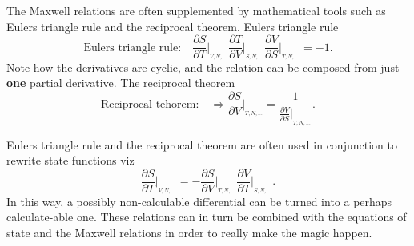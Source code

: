 The Maxwell relations are often supplemented by mathematical tools such as Eulers triangle rule and the reciprocal theorem. Eulers triangle rule
\begin{equation}
	\text{Eulers triangle rule:} \quad \frac{\partial S}{\partial T}\bigg|_{_{V,N,\dots}}\frac{\partial T}{\partial V}\bigg|_{_{S,N,\dots}}\frac{\partial V}{\partial S}\bigg|_{_{T,N,\dots}}=-1.
	\label{q9}
\end{equation} 
Note how the derivatives are cyclic, and the relation can be composed from just \textbf{one} partial derivative. The reciprocal theorem
\begin{equation}
	\text{Reciprocal tehorem:}\quad \Rightarrow \frac{\partial S}{\partial V}\bigg|_{_{T,N,\dots}}=\frac{1}{\frac{\partial V}{\partial S}\big|_{_{T,N,\dots}}}.
	\label{q10}    
\end{equation} 

\begin{example}
	Eulers triangle rule and the reciprocal theorem are often used in conjunction to rewrite state functions viz
	\begin{equation}
		\frac{\partial S}{\partial T}\bigg|_{_{V,N,\dots}}=-\frac{\partial S}{\partial V}\bigg|_{_{T,N,\dots}}\frac{\partial V}{\partial T}\bigg|_{_{S,N,\dots}}  .
	\end{equation}  
	In this way, a possibly non-calculable differential can be turned into a perhaps calculate-able one. These relations can in turn be combined with the equations of state and the Maxwell relations in order to really make the magic happen. 
\end{example}

